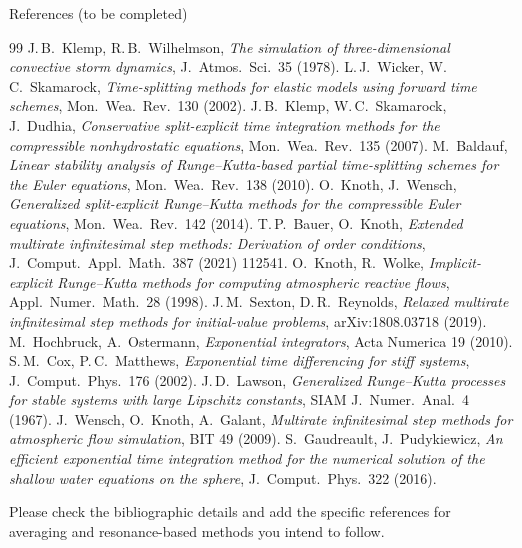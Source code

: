 \documentclass[aspectratio=169,10pt]{beamer}
\begin{document}
\begin{frame}[allowframebreaks]{References (to be completed)}
  \footnotesize
  \begin{thebibliography}{99}
     J.\,B.\ Klemp, R.\,B.\ Wilhelmson, \emph{The simulation of three-dimensional convective storm dynamics}, J.\ Atmos.\ Sci.\ 35 (1978).
     L.\,J.\ Wicker, W.\,C.\ Skamarock, \emph{Time-splitting methods for elastic models using forward time schemes}, Mon.\ Wea.\ Rev.\ 130 (2002).
     J.\,B.\ Klemp, W.\,C.\ Skamarock, J.\ Dudhia, \emph{Conservative split-explicit time integration methods for the compressible nonhydrostatic equations}, Mon.\ Wea.\ Rev.\ 135 (2007).
     M.\ Baldauf, \emph{Linear stability analysis of Runge--Kutta-based partial time-splitting schemes for the Euler equations}, Mon.\ Wea.\ Rev.\ 138 (2010).
     O.\ Knoth, J.\ Wensch, \emph{Generalized split-explicit Runge--Kutta methods for the compressible Euler equations}, Mon.\ Wea.\ Rev.\ 142 (2014).
     T.\,P.\ Bauer, O.\ Knoth, \emph{Extended multirate infinitesimal step methods: Derivation of order conditions}, J.\ Comput.\ Appl.\ Math.\ 387 (2021) 112541.
     O.\ Knoth, R.\ Wolke, \emph{Implicit-explicit Runge--Kutta methods for computing atmospheric reactive flows}, Appl.\ Numer.\ Math.\ 28 (1998).
     J.\,M.\ Sexton, D.\,R.\ Reynolds, \emph{Relaxed multirate infinitesimal step methods for initial-value problems}, arXiv:1808.03718 (2019).
     M.\ Hochbruck, A.\ Ostermann, \emph{Exponential integrators}, Acta Numerica 19 (2010).
     S.\,M.\ Cox, P.\,C.\ Matthews, \emph{Exponential time differencing for stiff systems}, J.\ Comput.\ Phys.\ 176 (2002).
     J.\,D.\ Lawson, \emph{Generalized Runge--Kutta processes for stable systems with large Lipschitz constants}, SIAM J.\ Numer.\ Anal.\ 4 (1967).
     J.\ Wensch, O.\ Knoth, A.\ Galant, \emph{Multirate infinitesimal step methods for atmospheric flow simulation}, BIT 49 (2009).
     S.\ Gaudreault, J.\ Pudykiewicz, \emph{An efficient exponential time integration method for the numerical solution of the shallow water equations on the sphere}, J.\ Comput.\ Phys.\ 322 (2016).
  \end{thebibliography}
  {\scriptsize Please check the bibliographic details and add the specific references for averaging and resonance-based methods you intend to follow.}
\end{frame}
\end{document}
